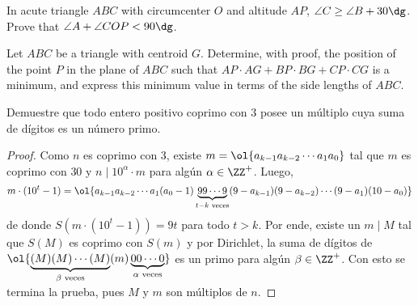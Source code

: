 \begin{probMG}[ISL 2001/G2]
	In acute triangle $ABC$ with circumcenter $O$ and altitude $AP$, $\angle C\ge\angle B+30\dg$. Prove that $\angle A+\angle COP<90\dg$.
\end{probMG}

\begin{probMR}[ISL 2001/G3]
	Let $ABC$ be a triangle with centroid $G$. Determine, with proof, the position of the point $P$ in the plane of $ABC$ such that $AP\cdot AG+BP\cdot BG+CP\cdot CG$ is a minimum, and express this minimum value in terms of the side lengths of $ABC$.
\end{probMR}


\begin{probEG}
	Demuestre que todo entero positivo coprimo con $3$ posee un múltiplo cuya suma de dígitos es un número primo.
\end{probEG}

\begin{proof}
	Como $n$ es coprimo con $3$, existe $m=\ol{a_{k-1}a_{k-2}\cdots a_1a_0}$ tal que $m$ es coprimo con $30$ y $n\mid 10^\alpha\cdot m$ para algún $\alpha\in\ZZ^+$. Luego,
	\[m\cdot(10^t-1)=\ol{a_{k-1}a_{k-2}\cdots a_1(a_0-1)\underbrace{99\cdots 9}_{t-k\text{ veces}}(9-a_{k-1})(9-a_{k-2})\cdots(9-a_1)(10-a_0)}\]
	de donde $S(m\cdot(10^t-1))=9t$ para todo $t>k$. Por ende, existe un $m\mid M$ tal que $S(M)$ es coprimo con $S(m)$ y por Dirichlet, la suma de dígitos de $\ol{\underbrace{(M)(M)\cdots (M)}_{\beta\text{ veces}}(m)\underbrace{00\cdots 0}_{\alpha\text{ veces}}}$ es un primo para algún $\beta\in\ZZ^+$. Con esto se termina la prueba, pues $M$ y $m$ son múltiplos de $n$.
\end{proof}
